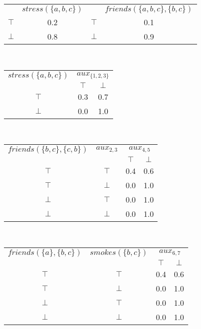 \begin{multicols*}{2}
\begin{center}

	\begin{tabular}{c|cc|c}
		& \underline{$stress(\{a,b,c\})$} & & \underline{$friends(\{a,b,c\},\{b,c\})$}\\
		$\top$ & 0.2 & $\top$ & 0.1 \\
		$\bot$ & 0.8 & $\bot$ & 0.9
	\end{tabular}
	\vspace{0.5cm}\\
	
	\begin{tabular}{c|cc}
		\underline{$stress(\{a,b,c\})$} & \multicolumn{2}{c}{\underline{$aux_{\{1,2,3\}}$}} \\
		& $\top$ & $\bot$ \\
		$\top$ & 0.3 & 0.7 \\
		$\bot$ & 0.0 & 1.0
	\end{tabular}
	\vspace{0.5cm}\\
	
	\begin{tabular}{cc|cc}
		\underline{$friends(\{b,c\},\{c,b\})$} & \underline{$aux_{2,3}$} & \multicolumn{2}{c}{\underline{$aux_{4,5}$}} \\
		& & $\top$ & $\bot$ \\
		$\top$ & $\top$ & 0.4 & 0.6 \\
		$\top$ & $\bot$ & 0.0 & 1.0 \\
		$\bot$ & $\top$ & 0.0 & 1.0 \\
		$\bot$ & $\bot$ & 0.0 & 1.0 \\
	\end{tabular}
	\vspace{0.5cm}\\
	
	\begin{tabular}{cc|cc}
		\underline{$friends(\{a\},\{b,c\})$} & \underline{$smokes(\{b,c\})$} & \multicolumn{2}{c}{\underline{$aux_{6,7}$}} \\
		& & $\top$ & $\bot$ \\
		$\top$ & $\top$ & 0.4 & 0.6 \\
		$\top$ & $\bot$ & 0.0 & 1.0 \\
		$\bot$ & $\top$ & 0.0 & 1.0 \\
		$\bot$ & $\bot$ & 0.0 & 1.0 \\
	\end{tabular}
	\vspace{0.5cm}\\
	

\end{center}
\end{multicols*}

